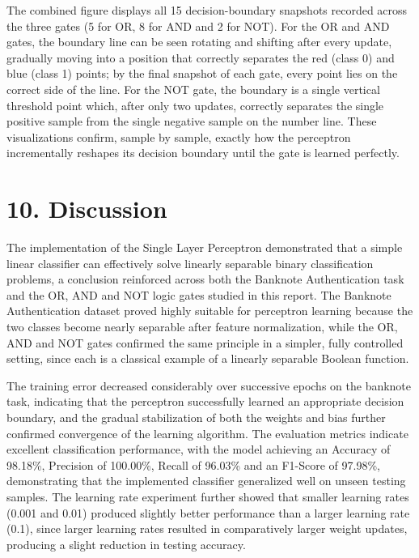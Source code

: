 \documentclass[11pt,a4paper]{article}
\begin{document}
The combined figure displays all 15 decision-boundary snapshots recorded across the three gates (5 for OR, 8 for AND and 2 for NOT). For the OR and AND gates, the boundary line can be seen rotating and shifting after every update, gradually moving into a position that correctly separates the red (class 0) and blue (class 1) points; by the final snapshot of each gate, every point lies on the correct side of the line. For the NOT gate, the boundary is a single vertical threshold point which, after only two updates, correctly separates the single positive sample from the single negative sample on the number line. These visualizations confirm, sample by sample, exactly how the perceptron incrementally reshapes its decision boundary until the gate is learned perfectly.
\section*{10. Discussion}

The implementation of the Single Layer Perceptron demonstrated that a simple linear classifier can effectively solve linearly separable binary classification problems, a conclusion reinforced across both the Banknote Authentication task and the OR, AND and NOT logic gates studied in this report. The Banknote Authentication dataset proved highly suitable for perceptron learning because the two classes become nearly separable after feature normalization, while the OR, AND and NOT gates confirmed the same principle in a simpler, fully controlled setting, since each is a classical example of a linearly separable Boolean function.

The training error decreased considerably over successive epochs on the banknote task, indicating that the perceptron successfully learned an appropriate decision boundary, and the gradual stabilization of both the weights and bias further confirmed convergence of the learning algorithm. The evaluation metrics indicate excellent classification performance, with the model achieving an Accuracy of 98.18\%, Precision of 100.00\%, Recall of 96.03\% and an F1-Score of 97.98\%, demonstrating that the implemented classifier generalized well on unseen testing samples. The learning rate experiment further showed that smaller learning rates (0.001 and 0.01) produced slightly better performance than a larger learning rate (0.1), since larger learning rates resulted in comparatively larger weight updates, producing a slight reduction in testing accuracy.
\end{document}
